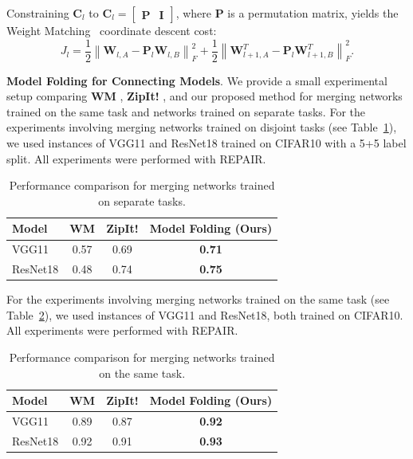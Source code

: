 \documentclass{article}
\newcommand\fakeparagraph[1]{\par\noindent\textbf{{#1}}.\xspace}
\begin{document}
{Constraining $\mathbf{C}_l$ to $\mathbf{C}_l = \begin{bmatrix} \mathbf{P} & \mathbf{I} \end{bmatrix}$, where $\mathbf{P}$ is a permutation matrix, yields the Weight Matching~\citep{ainsworth2023git} coordinate descent cost:
\begin{equation*}
    J_l = \frac{1}{2} \left\|\mathbf{W}_{l,A} - \mathbf{P}_l \mathbf{W}_{l,B} \right\|^2_F + \frac{1}{2} \left\|\mathbf{W}_{l+1,A}^T - \mathbf{P}_l \mathbf{W}_{l+1,B}^T \right\|^2_F.
\end{equation*}


\fakeparagraph{Model Folding for Connecting Models} We provide a small experimental setup comparing \textbf{WM} \citep{ainsworth2023git}, \textbf{ZipIt!} \citep{stoica2024zipitmergingmodelsdifferent}, and our proposed method for merging networks trained on the same task and networks trained on separate tasks.
% 
For the experiments involving merging  networks trained on disjoint tasks (see Table~\ref{tab:separate_tasks}), we used instances of VGG11 and ResNet18 trained on CIFAR10 with a 5+5 label split. All experiments were performed with REPAIR.

\begin{table}[H]
\centering
\begin{tabular}{l|ccc}
\toprule
\textbf{Model} & \textbf{WM} & \textbf{ZipIt!} & \textbf{Model Folding (Ours)} \\ 
\midrule
VGG11 & 0.57 & 0.69 & \textbf{0.71} \\ 
ResNet18 & 0.48 & 0.74 & \textbf{0.75} \\ 
\bottomrule
\end{tabular}
\caption{Performance comparison for merging networks trained on separate tasks.}
\label{tab:separate_tasks}
\end{table}

For the experiments involving merging networks trained on the same task (see Table~\ref{tab:same_task}), we used instances of VGG11 and ResNet18, both trained on CIFAR10. All experiments were performed with REPAIR.

\begin{table}[H]
\centering
\begin{tabular}{l|ccc}
\toprule
\textbf{Model} & \textbf{WM} & \textbf{ZipIt!} & \textbf{Model Folding (Ours)} \\ 
\midrule
VGG11 & 0.89 & 0.87 & \textbf{0.92} \\ 
ResNet18 & 0.92 & 0.91 & \textbf{0.93} \\ 
\bottomrule
\end{tabular}
\caption{Performance comparison for merging networks trained on the same task.}
\label{tab:same_task}
\end{table}

}
\end{document}

